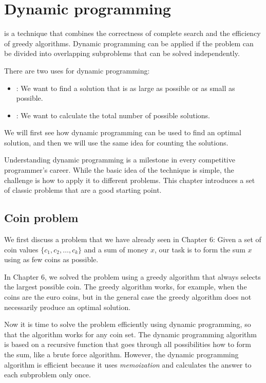 \chapter{Dynamic programming}


is a technique that combines the correctness
of complete search and the efficiency
of greedy algorithms.
Dynamic programming can be applied if the
problem can be divided into overlapping subproblems
that can be solved independently.

There are two uses for dynamic programming:

\begin{itemize}
\item
{}:
We want to find a solution that is
as large as possible or as small as possible.
\item
{}:
We want to calculate the total number of
possible solutions.
\end{itemize}

We will first see how dynamic programming can
be used to find an optimal solution,
and then we will use the same idea for
counting the solutions.

Understanding dynamic programming is a milestone
in every competitive programmer's career.
While the basic idea of the technique is simple,
the challenge is how to apply it to different problems.
This chapter introduces a set of classic problems
that are a good starting point.

\section{Coin problem}

We first discuss a problem that we
have already seen in Chapter 6:
Given a set of coin values $\{c_1,c_2,\ldots,c_k\}$
and a sum of money $x$, our task is to
form the sum $x$ using as few coins as possible.

In Chapter 6, we solved the problem using a
greedy algorithm that always selects the largest
possible coin.
The greedy algorithm works, for example,
when the coins are the euro coins,
but in the general case the greedy algorithm
does not necessarily produce an optimal solution.

Now it is time to solve the problem efficiently
using dynamic programming, so that the algorithm
works for any coin set.
The dynamic programming
algorithm is based on a recursive function
that goes through all possibilities how to
form the sum, like a brute force algorithm.
However, the dynamic programming
algorithm is efficient because
it uses \emph{memoization} and
calculates the answer to each subproblem only once.


